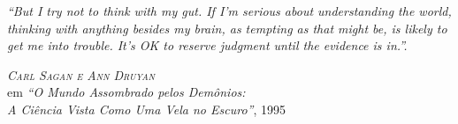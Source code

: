 
\begin{epigrafe} %

\hypertarget{estilo:epigrafe}{} %
 
\textit{\large``But I try not to think with my gut. If I'm serious about understanding the world, thinking with anything besides my brain, as tempting as that might be, is likely to get me into trouble. It's OK to reserve judgment until the evidence is in.''.}

\vspace{1cm}

\hspace{4cm} \emph{\textsc{Carl Sagan e Ann Druyan}}\\
\hspace{4cm} em \textsl{``O Mundo Assombrado pelos Demônios:}\\
\hspace{4cm} \textsl{A Ciência Vista Como Uma Vela no Escuro''}, 1995

\end{epigrafe}
